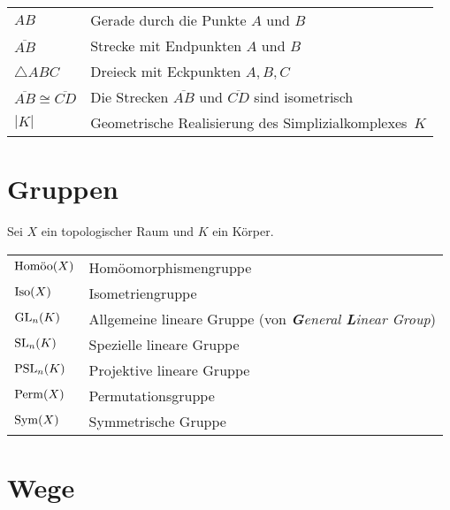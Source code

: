 \settowidth{}
\setlength\mylengthb{\dimexpr\columnwidth-\mylengtha-2\tabcolsep\relax}

\begin{xtabular}{@{} p{\mylengtha} P{\mylengthb} @{}}
$AB$                               & Gerade durch die Punkte $A$ und $B$\\
$\overline{AB}$                    & Strecke mit Endpunkten $A$ und $B$\\
$\triangle ABC$                    & Dreieck mit Eckpunkten $A, B, C$\\
$\overline{AB} \cong \overline{CD}$& Die Strecken $\overline{AB}$ und $\overline{CD}$ sind isometrisch\\
$|K|$                              & Geometrische Realisierung des Simplizialkomplexes~$K$\\
\end{xtabular}
\section*{Gruppen}

Sei $X$ ein topologischer Raum und $K$ ein Körper.

\settowidth{}
\setlength\mylengthb{\dimexpr\columnwidth-\mylengtha-2\tabcolsep\relax}

\begin{xtabular}{@{} p{\mylengtha} P{\mylengthb} @{}}
$\Homoo(X)$ & Homöomorphis\-men\-gruppe\\
$\Iso(X)$   & Isometrien\-gruppe\\
$\GL_n(K)$  & Allgemeine lineare Gruppe (von \textit{\textbf{G}eneral \textbf{L}inear Group})\\
$\SL_n(K)$  & Spezielle lineare Gruppe\\
$\PSL_n(K)$ & Projektive lineare Gruppe\\
$\Perm(X)$  & Permutations\-gruppe\\
$\Sym(X)$   & Symmetrische Gruppe\\
\end{xtabular}
\section*{Wege}

